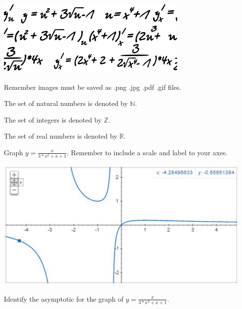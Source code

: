 \documentclass[11pt]{article}
\def\eq1{y=\frac{x}{3*x^2+x+1}}
\def\labelaxes{Remember to include a scale and label to your axes.}
\begin{document}
\begin{center}
\includegraphics[scale=0.5,angle=45]{algebra.png}

Remember images must be saved as .png .jpg .pdf .gif files.
\end{center}



The set of natural numbers is denoted by $\mathbb{N}$.

The set of integers is denoted by $\mathbb{Z}$.

The set of real numbers is denoted by $\mathbb{R}$.

Graph $\eq1$. \labelaxes

\includegraphics[width = 5in]{plot.jpg}

Identify the asymptotic for the graph of $\eq1$. 
\end{document}
